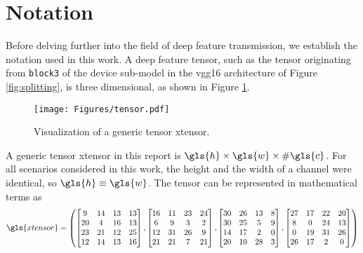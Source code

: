 \section{Notation}
Before delving further into the field of deep feature transmission, we establish the notation used in this work. A deep feature tensor, such as the tensor originating from \verb|block3| of the device sub-model in the \gls{vgg16} architecture of Figure \ref{fig:splitting}, is three dimensional, as shown in Figure \ref{fig:intro:tensor}.

\begin{figure}[H]
	\centering
	\texttt{[image: Figures/tensor.pdf]}
	\caption[Visualization of a generic tensor]{Visualization of a generic tensor \gls{xtensor}.}
	\label{fig:intro:tensor}
\end{figure}

A generic tensor \gls{xtensor} in this report is $\gls{h} \times \gls{w} \times \# \gls{c}$. For all scenarios considered in this work, the height and the width of a channel were identical, so $\gls{h} \equiv \gls{w}$. The tensor can be represented in mathematical terms as
\begin{equation}
	\gls{xtensor} = \begin{pmatrix}
		\begin{bmatrix}
			9 & 14 & 13 & 13 \\
			20 & 4 & 16 & 13 \\
			23 & 21 & 12 & 25\\
			12 & 14 & 13 & 16
		\end{bmatrix}
	,
	\begin{bmatrix}
		16 & 11 & 23 & 24 \\
		6 & 9 & 3 & 2 \\
		12 & 31 & 26 & 9 \\
		21 & 21 & 7 & 21\\
	\end{bmatrix}
,
\begin{bmatrix}
	30 & 26 & 13 & 8 \\
	30 & 25 & 5 & 9 \\
	14 & 17 & 2 & 0\\
	20 & 10 & 28 & 3
\end{bmatrix}
,
\begin{bmatrix}
	27 & 17 & 22 & 20 \\
	8 & 0 & 24 & 13 \\
	0 & 19 & 31 & 26 \\
	26 & 17 & 2 & 0
\end{bmatrix}
	\end{pmatrix}
\end{equation}


